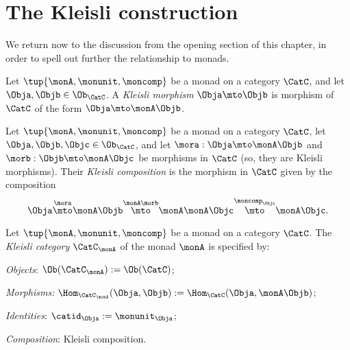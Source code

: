 

\section{The Kleisli construction}
\label{sec:Kleisli}

We return now to the discussion from the opening section of this chapter, in order to spell out further the relationship to monads. 


\begin{ctdefinition}
Let $\tup{\monA, \monunit, \moncomp}$ be a monad on a category $\CatC$, and let $\Obja, \Objb \in \Ob_\CatC$. A 
\emph{Kleisli morphism} $\Obja \mto \Objb$ is morphism of $\CatC$ of the form $\Obja \mto \monA \Objb$. 
\end{ctdefinition}


\begin{ctdefinition}
Let $\tup{\monA, \monunit, \moncomp}$ be a monad on a category $\CatC$, let $\Obja, \Objb, \Objc \in \Ob_\CatC$,  and let $\mora : \Obja \mto \monA \Objb$ and $\morb : \Objb \mto \monA \Objc$ be morphisms in $\CatC$ (so, they are Kleisli morphisms). Their \emph{Kleisli composition} is the morphism in $\CatC$ given by the composition
\begin{equation}
\Obja \overset{\mora}{\mto} \monA \Objb \overset{\monA \morb}{\mto} \monA \monA \Objc \overset{\moncomp_\Objc}{\mto} \monA \Objc.
\end{equation}
\end{ctdefinition}

\begin{ctdefinition}
Let $\tup{\monA, \monunit, \moncomp}$ be a monad on a category $\CatC$. The \emph{Kleisli category} $\CatC_\monA$ of the monad $\monA$ is specified by:
\begin{compactenum}
\item \emph{Objects}: $\Ob(\CatC_\monA) := \Ob(\CatC)$;
\item \emph{Morphisms:} $\Hom_{\CatC_\monA}(\Obja, \Objb) := \Hom_{\CatC}(\Obja, \monA \Objb)$;
\item \emph{Identities}: $\catid_\Obja := \monunit_\Obja$; 
\item \emph{Composition}: Kleisli composition. 
\end{compactenum}
\end{ctdefinition}


